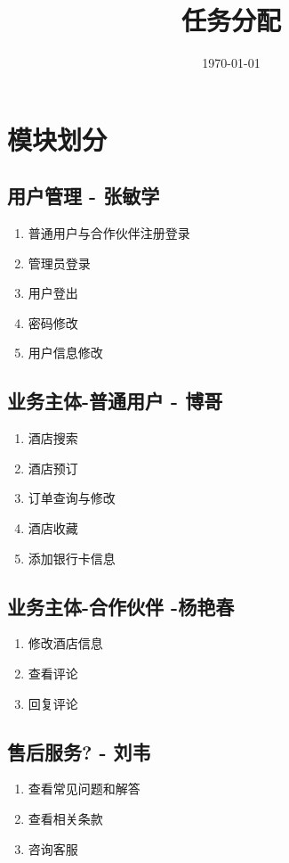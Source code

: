 \documentclass[18pt]{article}
\begin{document}
\tableofcontents
\title{任务分配}
\date{\today}
\maketitle

\section{模块划分}

	\subsection{用户管理 - 张敏学}
	\begin{enumerate}
		\item 普通用户与合作伙伴注册登录
		\item 管理员登录
		\item 用户登出
		\item 密码修改
		\item 用户信息修改
	\end{enumerate}
	
	\subsection{业务主体-普通用户 - 博哥}
	\begin{enumerate}
		\item 酒店搜索
		\item 酒店预订
		\item 订单查询与修改
		\item 酒店收藏
		\item 添加银行卡信息
	\end{enumerate}
	
	\subsection{业务主体-合作伙伴 -杨艳春}
	\begin{enumerate}
		\item 修改酒店信息
		\item 查看评论
		\item 回复评论
	\end{enumerate}
	
	\subsection{售后服务? - 刘韦}
	\begin{enumerate}
		\item 查看常见问题和解答
		\item 查看相关条款
		\item 咨询客服
	\end{enumerate}
	
\end{document}
